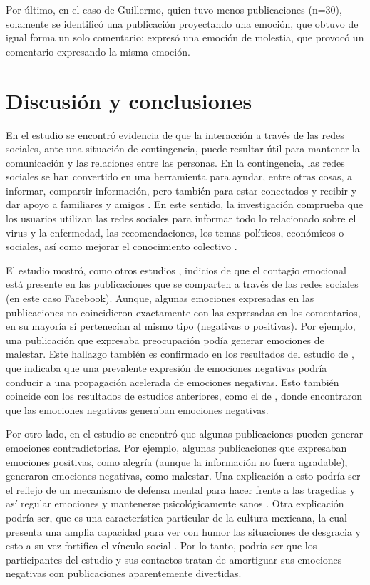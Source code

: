 \documentclass[spanish]{textolivre}
\begin{document}
Por último, en el caso de Guillermo, quien tuvo menos publicaciones (n=30), solamente se identificó una publicación proyectando una emoción, que obtuvo de igual forma un solo comentario; expresó una emoción de molestia, que provocó un comentario expresando la misma emoción. 


\section{Discusión y conclusiones}

En el estudio se encontró evidencia de que la interacción a través de las redes sociales, ante una situación de contingencia, puede resultar útil para mantener la comunicación y las relaciones entre las personas. En la contingencia, las redes sociales se han convertido en una herramienta para ayudar, entre otras cosas, a informar, compartir información, pero también para estar conectados y recibir y dar apoyo a familiares y amigos \cite{saud2020}. En este sentido, la investigación comprueba que los usuarios utilizan las redes sociales para informar todo lo relacionado sobre el virus y la enfermedad, las recomendaciones, los temas políticos, económicos o sociales, así como mejorar el conocimiento colectivo \cite{saud2020}. 

El estudio mostró, como otros estudios \cite{rosenbusch2019,guo2020,sasaki2021}, indicios de que el contagio emocional está presente en las publicaciones que se comparten a través de las redes sociales (en este caso Facebook). Aunque, algunas emociones expresadas en las publicaciones no coincidieron exactamente con las expresadas en los comentarios, en su mayoría sí pertenecían al mismo tipo (negativas o positivas). Por ejemplo, una publicación que expresaba preocupación podía generar emociones de malestar. Este hallazgo también es confirmado en los resultados del estudio de \textcite{goldenberg2020}, que indicaba que una prevalente expresión de emociones negativas podría conducir a una propagación acelerada de emociones negativas. Esto también coincide con los resultados de estudios anteriores, como el de \textcite{hatfield1993}, donde encontraron que las emociones negativas generaban emociones negativas.

Por otro lado, en el estudio se encontró que algunas publicaciones pueden generar emociones contradictorias. Por ejemplo, algunas publicaciones que expresaban emociones positivas, como alegría (aunque la información no fuera agradable), generaron emociones negativas, como malestar. Una explicación a esto podría ser el reflejo de un mecanismo de defensa mental para hacer frente a las tragedias \cite{dundes1987} y así regular emociones y mantenerse psicológicamente sanos \cite{Bazarova2015,iglesiasSanchez2020}. Otra explicación podría ser, que es una característica particular de la cultura mexicana, la cual presenta una amplia capacidad para ver con humor las situaciones de desgracia \cite{ruiz2018} y esto a su vez fortifica el vínculo social \cite{yus2018}. Por lo tanto, podría ser que los participantes del estudio y sus contactos tratan de amortiguar sus emociones negativas con publicaciones aparentemente divertidas. 
\end{document}
